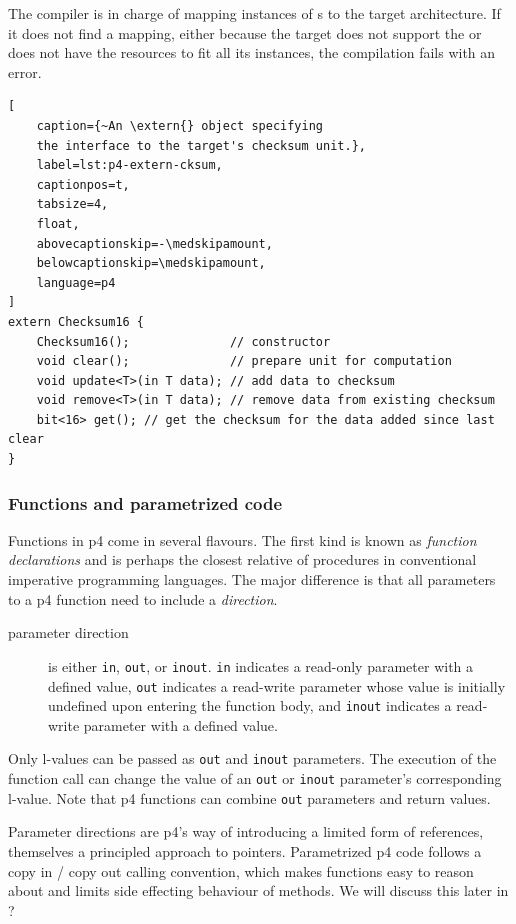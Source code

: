 The compiler is in charge of mapping instances of \extern{}s to the target
architecture. If it does not find a mapping, either because the target does not
support the \extern{} or does not have the resources to fit all its instances,
the compilation fails with an error.

\begin{lstlisting}[
	caption={~An \extern{} object specifying
	the interface to the target's checksum unit.},
	label=lst:p4-extern-cksum,
	captionpos=t,
	tabsize=4,
	float,
	abovecaptionskip=-\medskipamount,
	belowcaptionskip=\medskipamount,
	language=p4
]
extern Checksum16 {
	Checksum16();              // constructor
	void clear();              // prepare unit for computation
	void update<T>(in T data); // add data to checksum
	void remove<T>(in T data); // remove data from existing checksum
	bit<16> get(); // get the checksum for the data added since last clear
}
\end{lstlisting}

\subsubsection*{Functions and parametrized code}

Functions in \acrshort{p4} come in several flavours. The first kind is known as
\emph{function declarations} and is perhaps the closest relative of procedures
in conventional imperative programming languages. The major difference is that
all parameters to a \acrshort{p4} function need to include a \emph{direction}.

\begin{description}
	\item[parameter direction] is either \texttt{in}, \texttt{out}, or
	\texttt{inout}. \texttt{in} indicates a read-only parameter with a defined
	value, \texttt{out} indicates a read-write parameter whose value is
	initially undefined upon entering the function body, and \texttt{inout}
	indicates a read-write parameter with a defined value.
\end{description}

Only l-values can be passed as \texttt{out} and
\texttt{inout} parameters. The execution of the function call can change the
value of an \texttt{out} or \texttt{inout} parameter's corresponding l-value.
Note that \acrshort{p4} functions can combine \texttt{out} parameters and return
values.

Parameter directions are \acrshort{p4}'s way of introducing a limited form of
references, themselves a principled approach to pointers. Parametrized
\acrshort{p4} code follows a copy in / copy out calling convention, which makes
functions easy to reason about and limits side effecting behaviour of \extern{}
methods. We will discuss this later in ?

